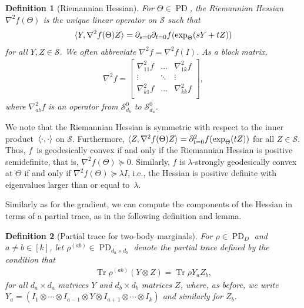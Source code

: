 \documentclass{article}
\newtheorem{definition}{Definition}
\newcommand{\ot}{\otimes}
\renewcommand{\vec}{\bm}
\newcommand\PD{\operatorname{PD}}
\newcommand\Sym{\mathcal{S}}
\newcommand\tr{\operatorname{Tr}}
\newcommand{\CF}[1]{{\color{purple}[CF: #1]}}
\newcommand{\MW}[1]{{\color{red}[MW: #1]}}
\begin{document}

\begin{definition}[Riemannian Hessian]
For $\Theta \in \PD$, the \emph{Riemannian Hessian}~$\nabla^2 f(\Theta)$ is the unique linear operator on $\Sym$ such that
\begin{align*}
  \braket{Y, \nabla^2 f(\Theta) Z} = \partial_{s=0} \partial_{t=0} f(\exp_{\Theta}(sY + tZ))
\end{align*}
for all $Y, Z\in \Sym$.
We often abbreviate $\nabla^2 f = \nabla^2 f(I)$.
As a block matrix,
\begin{align*}
  \nabla^2 f = \begin{bmatrix}
  \nabla_{11}^2 f & \dots & \nabla_{1k}^2 f \\
  \vdots & \ddots & \vdots \\
  \nabla_{k1}^2 f & \dots & \nabla_{kk}^2 f \\
  \end{bmatrix},
\end{align*}
where $\nabla_{ab}^2f$ is an operator from $\Sym_{d_b}^0$ to $\Sym_{d_a}^0$.
\end{definition}

We note that the Riemannian Hessian is symmetric with respect to the inner product~$\braket{\cdot,\cdot}$ on $\Sym$.
Furthermore, $\braket{Z, \nabla^2 f(\Theta) Z} = \partial^2_{t=0} f(\exp_{\Theta}(tZ))$ for all $Z\in \Sym$.
Thus, $f$~is geodesically convex if and only if the Riemannian Hessian is positive semidefinite, that is, $\nabla^2 f(\Theta) \succeq 0$.
Similarly, $f$ is $\lambda$-strongly geodesically convex at $\Theta$ if and only if $\nabla^2 f(\Theta) \succeq \lambda I$, i.e., the Hessian is positive definite with eigenvalues larger than or equal to~$\lambda$.

Similarly as for the gradient, we can compute the components of the Hessian in terms of a partial trace, as in the following definition and lemma.

\begin{definition}[Partial trace for two-body marginals]
For $\rho \in \PD_D$ and $a \neq b\in[k]$, let $\rho^{(ab)} \in \PD_{d_a \times d_b}$ denote the \emph{partial trace} defined by the condition that
\begin{align*}
  \tr \rho^{(ab)} (Y \ot Z) = \tr \rho Y_a Z_b,
\end{align*}
for all $d_a \times d_a$ matrices $Y$ and $d_b \times d_b$ matrices $Z$, where, as before, we write~$Y_a = (I_1 \ot \cdots \ot I_{a-1} \ot Y \ot I_{a+1} \ot \cdots \ot I_k)$ and similarly for $Z_b$. %
\end{definition}
\end{document}
